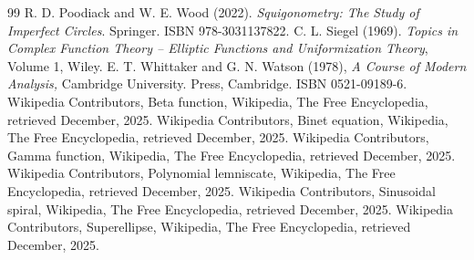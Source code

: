 \documentclass{amsart}
\theoremstyle{definition}
\begin{document}
\begin{thebibliography}{99}
R. D. Poodiack and W. E. Wood (2022). \textit{Squigonometry: The Study of Imperfect Circles}. Springer. ISBN 978-3031137822.
 C. L. Siegel (1969). \textit{Topics in Complex Function Theory -- Elliptic Functions and Uniformization Theory}, Volume 1, Wiley.
E. T. Whittaker and G. N. Watson (1978), \textit{A Course of Modern Analysis,} Cambridge University. Press, Cambridge. ISBN 0521-09189-6.
\newpage
{} Wikipedia Contributors, Beta function, Wikipedia, The Free Encyclopedia, retrieved December, 2025. 
\href{https://en.wikipedia.org/wiki/Beta_function}{\faExternalLink*}
 Wikipedia Contributors, Binet equation, Wikipedia, The Free 
Encyclopedia, retrieved December, 2025. \href{https://en.wikipedia.org/wiki/Binet_equation}{\faExternalLink*}
 Wikipedia Contributors, Gamma function, Wikipedia, The Free Encyclopedia, retrieved December, 2025. 
\href{https://en.wikipedia.org/wiki/Gamma_function}{\faExternalLink*}
 Wikipedia Contributors, Polynomial lemniscate, Wikipedia, The Free 
Encyclopedia, retrieved December, 2025. \href{https://en.wikipedia.org/wiki/Polynomial_lemniscate}{\faExternalLink*}
 Wikipedia Contributors, Sinusoidal spiral, Wikipedia, The Free 
Encyclopedia, retrieved December, 2025. \href{https://en.wikipedia.org/wiki/Sinusoidal_spiral}{\faExternalLink*}
 Wikipedia Contributors, Superellipse, Wikipedia, The Free 
Encyclopedia, retrieved December, 2025. \href{https://en.wikipedia.org/wiki/Superellipse}{\faExternalLink*}
\end{thebibliography}
\end{document}
